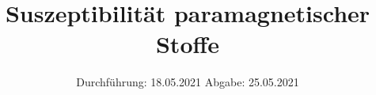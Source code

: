 

\subject{V606}
\title{Suszeptibilität paramagnetischer Stoffe}
\date{%
  Durchführung: 18.05.2021
  \hspace{3em}
  Abgabe: 25.05.2021
}



\maketitle
\thispagestyle{empty}
\tableofcontents
\newpage




\nocite{*}
\printbibliography{}


